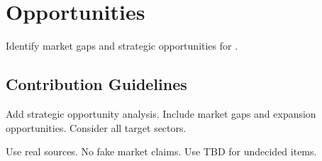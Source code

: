 \chapter{Opportunities}

Identify market gaps and strategic opportunities for \ProjectName.

\section{Contribution Guidelines}

Add strategic opportunity analysis. Include market gaps and expansion opportunities. Consider all target sectors.

Use real sources. No fake market claims. Use TBD for undecided items.

